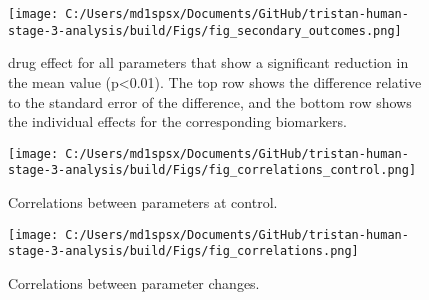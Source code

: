 \documentclass{epflreport}%
\begin{document}
%
\clearpage%


\begin{figure}[h!]%
\centering%
\texttt{[image: C:/Users/md1spsx/Documents/GitHub/tristan-human-stage-3-analysis/build/Figs/fig\_secondary\_outcomes.png]}%
\caption{drug effect for all parameters that show a significant reduction in the mean value (p<0.01). The top row shows the difference relative to the standard error of the difference, and the bottom row shows the individual effects for the corresponding biomarkers.}%
\end{figure}

%
\clearpage%


\begin{figure}[h!]%
\centering%
\texttt{[image: C:/Users/md1spsx/Documents/GitHub/tristan-human-stage-3-analysis/build/Figs/fig\_correlations\_control.png]}%
\caption{Correlations between parameters at control.}%
\end{figure}

%
\clearpage%


\begin{figure}[h!]%
\centering%
\texttt{[image: C:/Users/md1spsx/Documents/GitHub/tristan-human-stage-3-analysis/build/Figs/fig\_correlations.png]}%
\caption{Correlations between parameter changes.}%
\end{figure}

%
\clearpage%
\end{document}
